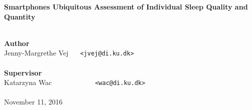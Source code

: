 \documentclass[a4paper,oneside]{memoir}
\begin{document}
    \thispagestyle{empty}
    \begin{adjustwidth}{-3cm}{-1.5cm}
    \vspace*{3.5cm}
    \textbf{\huge Smartphones Ubiquitous Assessment of Individual Sleep Quality and Quantity} \\
    \vspace*{.1cm} \\
    \begin{tabbing}
    \textbf{\Large Author} \\
    Jenny-Margrethe Vej ~~ \= \texttt{<jvej@di.ku.dk>} \\
    \vspace*{.1cm} \\
    \textbf{\Large Supervisor} \\
    Katarzyna Wac ~~~~~~~~~~~ \= \texttt{<wac@di.ku.dk>} \\
    \vspace*{.1cm} \\
    November 11, 2016
    \\[11.7cm]
    \end{tabbing}
    \end{adjustwidth}
    \ClearWallPaper
\end{document}
